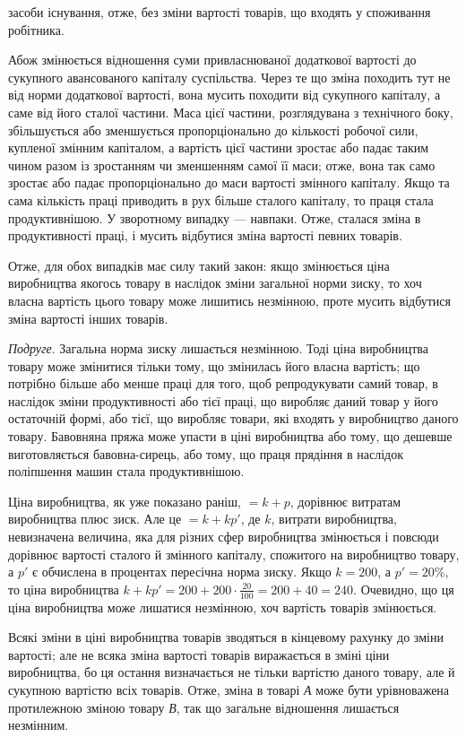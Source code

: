 \parcont{}  %
засоби існування, отже, без зміни вартості товарів, що входять у споживання робітника.

Абож змінюється відношення суми привласнюваної додаткової вартості до сукупного авансованого
капіталу суспільства. Через те що зміна походить тут не від норми додаткової вартості, вона мусить
походити від сукупного капіталу, а саме від його сталої частини. Маса цієї частини, розглядувана з
технічного боку, збільшується або зменшується пропорціонально до кількості робочої сили, купленої
змінним капіталом, а вартість цієї частини зростає або падає таким чином разом із зростанням чи
зменшенням самої її маси; отже, вона так само зростає або падає пропорціонально до маси вартості
змінного капіталу. Якщо та сама кількість праці приводить в рух більше сталого капіталу, то праця
стала продуктивнішою. У зворотному випадку — навпаки. Отже, сталася зміна в продуктивності праці, і
мусить відбутися зміна вартості певних товарів.

Отже, для обох випадків має силу такий закон: якщо змінюється ціна виробництва якогось товару в
наслідок зміни загальної норми зиску, то хоч власна вартість цього товару може лишитись незмінною,
проте мусить відбутися зміна вартості інших товарів.

\emph{Подруге}. Загальна норма зиску лишається незмінною. Тоді ціна виробництва товару може змінитися
тільки тому, що змінилась його власна вартість; що потрібно більше або менше праці для того, щоб
репродукувати самий товар, в наслідок зміни продуктивності або тієї праці, що виробляє даний товар у
його остаточній формі, або тієї, що виробляє товари, які входять у виробництво даного товару.
Бавовняна пряжа може упасти в ціні виробництва або тому, що дешевше виготовляється бавовна-сирець,
або тому, що праця прядіння в наслідок поліпшення машин стала продуктивнішою.

Ціна виробництва, як уже показано раніш, $= k + p$, дорівнює витратам виробництва плюс зиск. Але це
$= k + kp'$, де $k$, витрати виробництва, невизначена величина, яка для різних сфер виробництва змінюється
і повсюди дорівнює вартості сталого й змінного капіталу, спожитого на виробництво товару, а $p'$ є
обчислена в процентах пересічна норма зиску. Якщо $k = 200$, а $p' = 20\%$, то ціна виробництва $k + kp' =
200 + 200\cdot\frac{20}{100} = 200
+ 40 = 240$. Очевидно, що ця ціна виробництва може лишатися незмінною, хоч вартість товарів
змінюється.

Всякі зміни в ціні виробництва товарів зводяться в кінцевому рахунку до зміни вартості; але не всяка
зміна вартості товарів виражається в зміні ціни виробництва, бо ця остання визначається не тільки
вартістю даного товару, але й сукупною вартістю всіх товарів. Отже, зміна в товарі \emph{А} може бути
урівноважена протилежною зміною товару \emph{В}, так що загальне відношення лишається незмінним.
